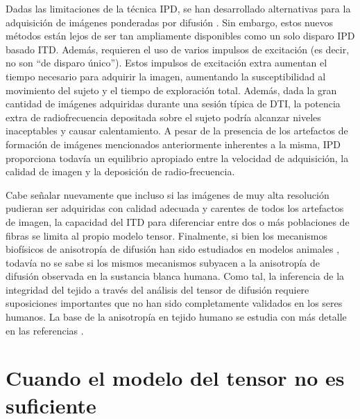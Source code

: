 Dadas las limitaciones de la técnica IPD, se han desarrollado alternativas para la adquisición de imágenes ponderadas por difusión \cite{Gudbjartsson_1996,Alsop1997,Nolte2000,Pipe2006,Pipe2002,Sarlls2005}. Sin embargo, estos nuevos métodos están lejos de ser tan ampliamente disponibles como un solo disparo IPD basado ITD. Además, requieren el uso de varios impulsos de excitación (es decir, no son ``de disparo único''). Estos impulsos de excitación extra aumentan el tiempo necesario para adquirir la imagen, aumentando la susceptibilidad al movimiento del sujeto y el tiempo de exploración total. Además, dada la gran cantidad de imágenes adquiridas durante una sesión típica de DTI, la potencia extra de radiofrecuencia depositada sobre el sujeto podría alcanzar niveles inaceptables y causar calentamiento. A pesar de la presencia de los artefactos de formación de imágenes mencionados anteriormente inherentes a la misma, IPD proporciona todavía un equilibrio apropiado entre la velocidad de adquisición, la calidad de imagen y la deposición de radio-frecuencia.

Cabe señalar nuevamente que incluso si las imágenes de muy alta resolución pudieran ser adquiridas con calidad adecuada y carentes de todos los artefactos de imagen, la capacidad del ITD para diferenciar entre dos o más poblaciones de fibras se limita al propio modelo tensor. Finalmente, si bien los mecanismos biofísicos de anisotropía de difusión han sido estudiados en modelos animales \cite{Beaulieu2002}, todavía no se sabe si los mismos mecanismos subyacen a la anisotropía de difusión observada en la sustancia blanca humana. Como tal, la inferencia de la integridad del tejido a través del análisis del tensor de difusión requiere suposiciones importantes que no han sido completamente validados en los seres humanos. La base de la anisotropía en tejido humano se estudia con más detalle en las referencias \cite{Beaulieu_1994, Beaulieu_1994a, Beaulieu2002}.

\section{Cuando el modelo del tensor no es suficiente}

